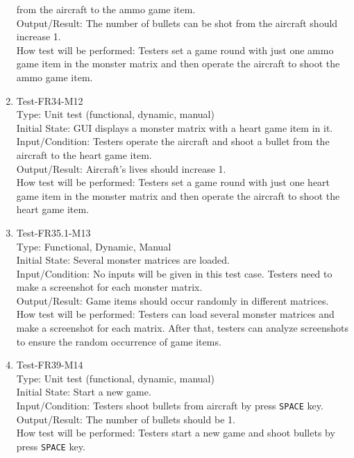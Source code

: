 \documentclass[12pt]{article}
\begin{document}
\begin{enumerate}[1.]
from the aircraft to the ammo game item.\\
Output/Result: The number of bullets can be shot from the 
aircraft should increase 1.\\
How test will be performed: Testers set a game round
with just one ammo game item in the monster matrix and then operate
the aircraft to shoot the ammo game item.
\item Test-FR34-M12\\
Type: Unit test (functional, dynamic, manual)\\
Initial State: GUI displays a monster matrix with a heart
game item in it.\\
Input/Condition:  Testers operate the aircraft and shoot a bullet
from the aircraft to the heart game item.\\
Output/Result: Aircraft's lives should increase 1.\\
How test will be performed:  Testers set a game round
with just one heart game item in the monster matrix and then operate
the aircraft to shoot the heart game item.
\item Test-FR35.1-M13\\
Type: Functional, Dynamic, Manual\\
Initial State: Several monster matrices are loaded.\\ 
Input/Condition: No inputs will be given in this test case. Testers
need to make a screenshot for
each monster matrix.\\
Output/Result: Game items should occur randomly in 
different matrices.\\
How test will be performed: Testers can load several 
monster matrices and make a screenshot for each matrix.
After that, testers can analyze screenshots to ensure
the random occurrence of game items.
\newpage
\item Test-FR39-M14\\
Type: Unit test (functional, dynamic, manual)\\
Initial State: Start a new game.\\
Input/Condition: Testers shoot bullets from 
aircraft by press \verb|SPACE| key.\\
Output/Result: The number of bullets should be 1.\\
How test will be performed: Testers start a new game
and shoot bullets by press \verb|SPACE| key.
\end{enumerate}
\end{document}
